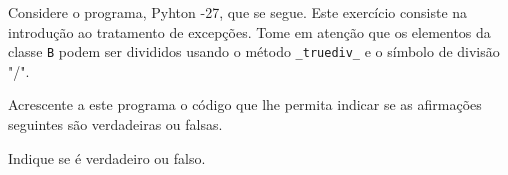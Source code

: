 \documentclass[12pt,varwidth=16cm,border=1pt]{standalone}
\begin{document}
Considere o programa, Pyhton -27, que se segue. Este exercício consiste na introdução ao tratamento de excepções. Tome em atenção que os elementos da classe \verb+B+ podem ser divididos usando o método \verb+_truediv_+ e o símbolo de divisão "/".



Acrescente a este programa o código que lhe permita indicar se as
afirmações seguintes são verdadeiras ou falsas.

Indique se é verdadeiro ou falso.
\end{document}
